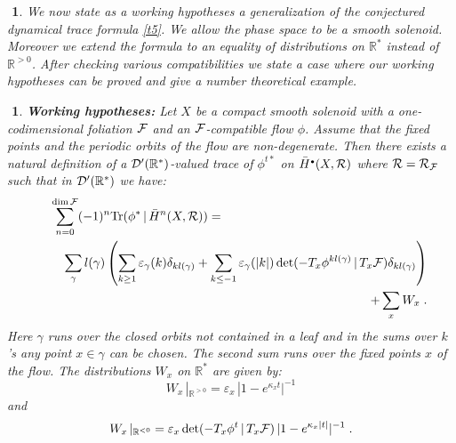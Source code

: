 \documentclass[11pt,leqno]{article}
\newcommand{\R}{{\mathbb{R}}}
\newcommand{\Tr}{\mathrm{Tr}}
\newcommand{\Dh}{{\cal D}}
\newcommand{\Fh}{{\cal F}}
\newcommand{\Rh}{{\cal R}}
\newcommand{\oH}{\bar{H}}
\newcommand{\tei}{\, | \,}
\newcommand{\hullet}{{\scriptscriptstyle \bullet}}
\newtheorem{punkt}[theorem]{$\!\!$}
\begin{document}
\begin{punkt}
  \label{t15} \rm
We now state as a working hypotheses a generalization of the conjectured dynamical trace formula \ref{t5}. We allow the phase space to be a smooth solenoid. Moreover we extend the formula to an equality of distributions on $\R^*$ instead of $\R^{>0}$. After checking various compatibilities we state a case where our working hypotheses can be proved and give a number theoretical example.
\end{punkt}

\begin{punkt} {\bf Working hypotheses:}
  \label{t16} \rm
Let $X$ be a compact smooth solenoid with a one-codimensional foliation $\Fh$ and an $\Fh$-compatible flow $\phi$. Assume that the fixed points and the periodic orbits of the flow are non-degenerate. Then there exists a natural definition of a $\Dh' (\R^*)$-valued trace of $\phi^{t*}$ on $\oH^{\hullet} (X, \Rh)$ where $\Rh = \Rh_{\Fh}$ such that in $\Dh' (\R^*)$ we have:
\begin{eqnarray}
  \label{eq:33}
\hspace*{0.5cm}  \lefteqn{\sum^{\dim \Fh}_{n=0} (-1)^n \Tr (\phi^* \tei \oH^n (X , \Rh)) = }\\
& & \sum_{\gamma} l (\gamma) \left( \sum_{k \ge 1} \varepsilon_{\gamma} (k) \delta_{k l (\gamma)} + \sum_{k \le -1} \varepsilon_{\gamma} (|k|) \det (-T_x \phi^{kl (\gamma)} \tei T_x \Fh) \delta_{kl (\gamma)} \right) \nonumber \\
& & + \sum_x W_x \; . \nonumber
\end{eqnarray}
Here $\gamma$ runs over the closed orbits not contained in a leaf and in the sums over $k$'s any point $x \in \gamma$ can be chosen. The second sum runs over the fixed points $x$ of the flow. The distributions $W_x$ on $\R^*$ are given by:
\[
W_x \, |_{\R^{> 0}} = \varepsilon_x \, |1 - e^{\kappa_x t}|^{-1}
\]
and
\[
W_x \, |_{\R^{< 0}} = \varepsilon_x \det (-T_x \phi^t \tei T_x \Fh) \, |1 - e^{\kappa_x |t|}|^{-1} \; .
\]
\end{punkt}
\end{document}
